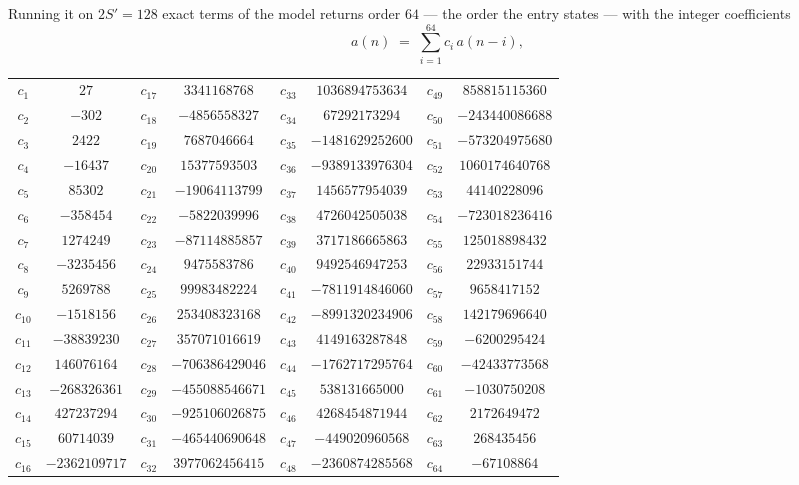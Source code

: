\documentclass[11pt,a4paper]{article}
\theoremstyle{plain}
\theoremstyle{definition}
\begin{document}
Running it on $2S'=128$ exact terms of the model returns order $64$ --- the order the
entry states --- with the integer coefficients
\[
a(n)\;=\;\sum_{i=1}^{64}c_i\,a(n-i),
\]
\begin{center}\small
\begin{tabular}{cccccccc}
$c_{1}$ & $27$ & $c_{17}$ & $3341168768$ & $c_{33}$ & $1036894753634$ & $c_{49}$ & $858815115360$ \\
$c_{2}$ & $-302$ & $c_{18}$ & $-4856558327$ & $c_{34}$ & $67292173294$ & $c_{50}$ & $-243440086688$ \\
$c_{3}$ & $2422$ & $c_{19}$ & $7687046664$ & $c_{35}$ & $-1481629252600$ & $c_{51}$ & $-573204975680$ \\
$c_{4}$ & $-16437$ & $c_{20}$ & $15377593503$ & $c_{36}$ & $-9389133976304$ & $c_{52}$ & $1060174640768$ \\
$c_{5}$ & $85302$ & $c_{21}$ & $-19064113799$ & $c_{37}$ & $1456577954039$ & $c_{53}$ & $44140228096$ \\
$c_{6}$ & $-358454$ & $c_{22}$ & $-5822039996$ & $c_{38}$ & $4726042505038$ & $c_{54}$ & $-723018236416$ \\
$c_{7}$ & $1274249$ & $c_{23}$ & $-87114885857$ & $c_{39}$ & $3717186665863$ & $c_{55}$ & $125018898432$ \\
$c_{8}$ & $-3235456$ & $c_{24}$ & $9475583786$ & $c_{40}$ & $9492546947253$ & $c_{56}$ & $22933151744$ \\
$c_{9}$ & $5269788$ & $c_{25}$ & $99983482224$ & $c_{41}$ & $-7811914846060$ & $c_{57}$ & $9658417152$ \\
$c_{10}$ & $-1518156$ & $c_{26}$ & $253408323168$ & $c_{42}$ & $-8991320234906$ & $c_{58}$ & $142179696640$ \\
$c_{11}$ & $-38839230$ & $c_{27}$ & $357071016619$ & $c_{43}$ & $4149163287848$ & $c_{59}$ & $-6200295424$ \\
$c_{12}$ & $146076164$ & $c_{28}$ & $-706386429046$ & $c_{44}$ & $-1762717295764$ & $c_{60}$ & $-42433773568$ \\
$c_{13}$ & $-268326361$ & $c_{29}$ & $-455088546671$ & $c_{45}$ & $538131665000$ & $c_{61}$ & $-1030750208$ \\
$c_{14}$ & $427237294$ & $c_{30}$ & $-925106026875$ & $c_{46}$ & $4268454871944$ & $c_{62}$ & $2172649472$ \\
$c_{15}$ & $60714039$ & $c_{31}$ & $-465440690648$ & $c_{47}$ & $-449020960568$ & $c_{63}$ & $268435456$ \\
$c_{16}$ & $-2362109717$ & $c_{32}$ & $3977062456415$ & $c_{48}$ & $-2360874285568$ & $c_{64}$ & $-67108864$ \\
\end{tabular}
\end{center}
\end{document}
